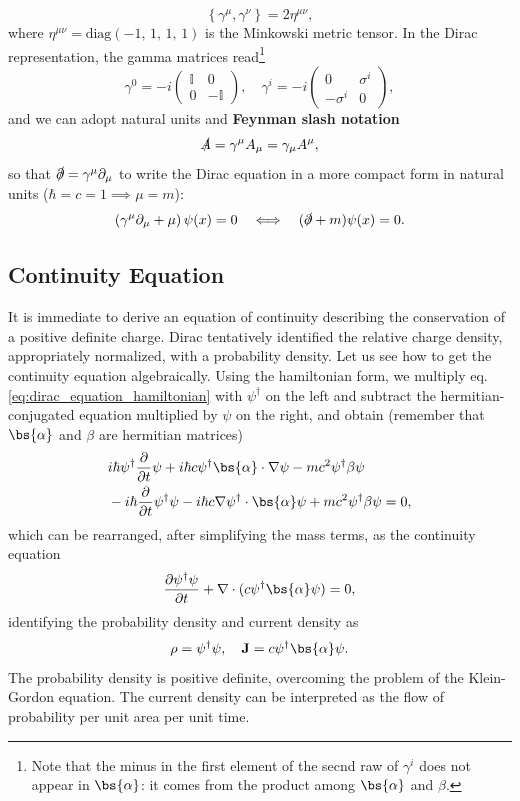 \[
    \left\{ \gamma^\mu, \gamma^\nu \right\} = 2 \eta^{\mu \nu},
\]
where \(\eta^{\mu \nu} = \text{diag}(-1,\,1,\,1,\,1)\) is the Minkowski metric tensor. In the Dirac representation, the gamma matrices read\footnote{Note that the minus in the first element of the secnd raw of \(\gamma^i\) does not appear in \(\bs{\alpha}\): it comes from the product among \(\bs{\alpha}\) and \(\beta\).}
\[
    \gamma^0 = -i \begin{pmatrix}
        \mathbb{I} & 0           \\
        0          & -\mathbb{I}
    \end{pmatrix}, \quad \gamma^i = -i \begin{pmatrix}
        0         & \sigma^i \\
        -\sigma^i & 0
    \end{pmatrix},
\]
and we can adopt natural units and \textbf{Feynman slash notation}
\[
    \slashed{A} = \gamma^{\mu} A_{\mu} = \gamma_{\mu} A^{\mu},
\]
so that \(\slashed{\partial} = \gamma^{\mu} \partial_{\mu}\) to write the Dirac equation in a more compact form in natural units (\(\hbar = c = 1 \implies \mu=m\)):
\[
    \left(\gamma^{\mu} \partial_{\mu} + \mu \right) \psi(x) = 0 \quad \Longleftrightarrow \quad (\slashed{\partial} + m) \psi(x) = 0.
\]

\subsection{Continuity Equation}

It is immediate to derive an equation of continuity describing the conservation of a positive definite charge. Dirac tentatively identified the relative charge density, appropriately normalized, with a probability density. Let us see how to get the continuity equation algebraically. Using the hamiltonian form, we multiply eq. \eqref{eq:dirac_equation_hamiltonian} with \(\psi^\dagger\) on the left and subtract the hermitian-conjugated equation multiplied by \(\psi\) on the right, and obtain (remember that \(\bs{\alpha}\) and \(\beta\) are hermitian matrices)
\[
    \begin{aligned}
         & i \hbar \psi^{\dagger} \frac{\partial}{\partial t} \psi + i \hbar c \psi^{\dagger} \bs{\alpha} \cdot \nabla \psi - m c^2 \psi^{\dagger} \beta \psi        \\
         & - i \hbar \frac{\partial}{\partial t} \psi^{\dagger} \psi - i \hbar c \nabla \psi^{\dagger} \cdot \bs{\alpha} \psi + m c^2 \psi^{\dagger} \beta \psi = 0,
    \end{aligned}
\]
which can be rearranged, after simplifying the mass terms, as the continuity equation
\begin{equation}
    \frac{\partial \psi^{\dagger} \psi}{\partial t} + \nabla \cdot (c \psi^{\dagger} \bs{\alpha} \psi) = 0,
    \label{eq:dirac_continuity_equation}
\end{equation}
identifying the probability density and current density as
\[
    \rho = \psi^{\dagger} \psi, \quad \mathbf{J} = c \psi^{\dagger} \bs{\alpha} \psi.
\]
The probability density is positive definite, overcoming the problem of the Klein-Gordon equation. The current density can be interpreted as the flow of probability per unit area per unit time.

